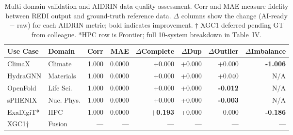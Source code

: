 \begin{table}[t]
\centering
\caption{Multi-domain validation and AIDRIN data quality assessment.
Corr and MAE measure fidelity between REDI output and ground-truth reference data.
$\Delta$ columns show the change (AI-ready $-$ raw) for each AIDRIN metric;
bold indicates improvement.
$\dagger$ XGC1 deferred pending GT from colleague.
*HPC row is Frontier; full 10-system breakdown in Table~IV.}
\label{tab:multidomain}
\begin{tabular}{llrrrrrr}
\toprule
\textbf{Use Case} & \textbf{Domain} & \textbf{Corr} & \textbf{MAE}
  & \textbf{$\Delta$Complete} & \textbf{$\Delta$Dup} & \textbf{$\Delta$Outlier} & \textbf{$\Delta$Imbalance} \\
\midrule
  ClimaX & Climate & 1.000 & 0.0000 & +0.000 & +0.000 & +0.000 & \textbf{-1.006} \\
  HydraGNN & Materials & 1.000 & 0.0000 & +0.000 & +0.000 & +0.040 & N/A \\
  OpenFold & Life Sci. & 1.000 & 0.0000 & +0.000 & +0.000 & \textbf{-0.012} & N/A \\
  sPHENIX & Nuc. Phys. & 1.000 & 0.0000 & +0.000 & +0.000 & \textbf{-0.003} & N/A \\
  ExaDigiT* & HPC & 1.000 & 0.0000 & \textbf{+0.193} & +0.000 & -0.000 & \textbf{-0.186} \\
  XGC1† & Fusion & — & — & — & — & — & — \\
\bottomrule
\end{tabular}
\end{table}
